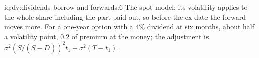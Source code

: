\begin{solution}{iq:dv:dividends-borrow-and-forwards:6}
The spot model: its volatility applies to the whole share including the part paid out, so
before the ex-date the forward moves more. For a one-year option with a 4\% dividend at
six months, about half a volatility point, 0.2 of premium at the money; the adjustment is
$\sigma^2(S/(S-\bar D))^2t_1+\sigma^2(T-t_1)$.
\end{solution}
